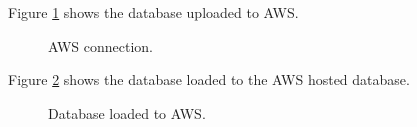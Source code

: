 Figure \ref{fig:awsConnection} shows the database uploaded to AWS.

\begin{figure}[!htb]
\caption{AWS connection.}
\label{fig:awsConnection}
\end{figure}


Figure \ref{fig:databaseLoaded}  shows the database loaded to the AWS hosted database.

\begin{figure}[!htb]
\caption{Database loaded to AWS.}
\label{fig:databaseLoaded}
\end{figure}




